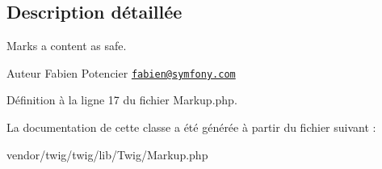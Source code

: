 \subsection{Description détaillée}
Marks a content as safe.

\begin{DoxyAuthor}{Auteur}
Fabien Potencier \href{mailto:fabien@symfony.com}{\tt fabien@symfony.\+com} 
\end{DoxyAuthor}


Définition à la ligne 17 du fichier Markup.\+php.



La documentation de cette classe a été générée à partir du fichier suivant \+:\begin{DoxyCompactItemize}
\item 
vendor/twig/twig/lib/\+Twig/Markup.\+php\end{DoxyCompactItemize}
